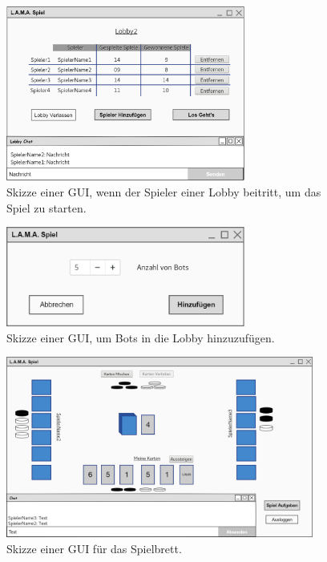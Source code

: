 \begin{figure}
	\centering
	\includegraphics[width=0.7\textwidth]{img/Lobby}
	\caption{Skizze einer GUI, wenn der Spieler einer Lobby beitritt, um das Spiel zu starten.}
	\label{gui:lobby}
\end{figure}
\begin{figure}
	\centering
	\includegraphics[width=0.7\textwidth]{img/addplayer2}
	\caption{Skizze einer GUI, um Bots in die Lobby hinzuzufügen.}
	\label{gui:addplayer}
\end{figure}
\begin{figure}
	\centering
	\includegraphics[width=0.9\textwidth]{img/spielbrett}
	\caption{Skizze einer GUI für das Spielbrett.}
	\label{gui:game}
\end{figure}
